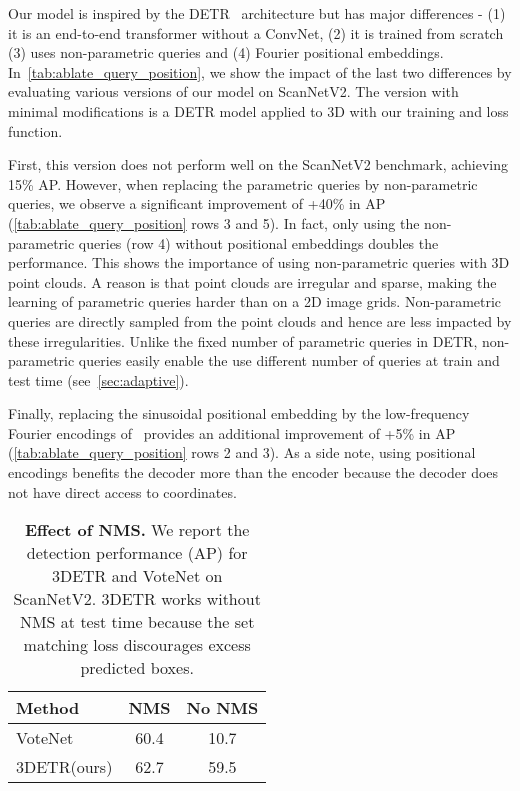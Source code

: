 \documentclass[10pt,twocolumn,letterpaper]{article}
\newcommand{\OURS}{3DETR\xspace}
\newcommand{\scannet}{ScanNetV2\xspace}
\newcommand{\rownumber}[1]{\textcolor{Cerulean}{#1}}
\begin{document}
Our model is inspired by the DETR~\cite{carion2020end} architecture but has major differences - (1) it is an end-to-end transformer without a ConvNet, (2) it is trained from scratch (3) uses non-parametric queries and (4) Fourier positional embeddings.
In~\cref{tab:ablate_query_position}, we show the impact of the last two differences by evaluating various versions of our model on \scannet.
The version with minimal modifications is a DETR model applied to 3D with our training and loss function.

First, this version does not perform well on the \scannet benchmark, achieving 15\% AP.
However, when replacing the parametric queries by non-parametric queries, we observe a significant improvement of +40\% in AP (\cref{tab:ablate_query_position} rows \rownumber{3} and \rownumber{5}).
In fact, only using the non-parametric queries (row \rownumber{4}) without positional embeddings doubles the performance.
This shows the importance of using non-parametric queries with 3D point clouds.
A reason is that point clouds are irregular and sparse, making the learning of parametric queries harder than on a 2D image grids.
Non-parametric queries are directly sampled from the point clouds and hence are less impacted by these irregularities.
Unlike the fixed number of parametric queries in DETR, non-parametric queries easily enable the use different number of queries at train and test time (see~\cref{sec:adaptive}).

Finally, replacing the sinusoidal positional embedding by the low-frequency Fourier encodings of~\cite{tancik2020fourfeat} provides an additional improvement of +5\% in AP (\cref{tab:ablate_query_position} rows \rownumber{2} and \rownumber{3}).
As a side note, using positional encodings benefits the decoder more than the encoder because the decoder does not have direct access to coordinates.


























\begin{table}[!t]
    \centering
    \begin{tabular}{@{}l|cc@{}}
    \toprule
    \textbf{Method} & NMS & No NMS \\
    \hline
    VoteNet~\cite{qi2019votenet} & 60.4 & 10.7 \\
    \OURS (ours) & 62.7 & 59.5 \\
    \bottomrule
    \end{tabular}
\vspace{-0.1in}
\caption{\textbf{Effect of NMS.} We report the detection performance (AP) for \OURS and VoteNet on \scannet.
\OURS works without NMS at test time because the set matching loss discourages excess predicted boxes.
}
\label{tab:ablate_nms}
\end{table}
\end{document}
